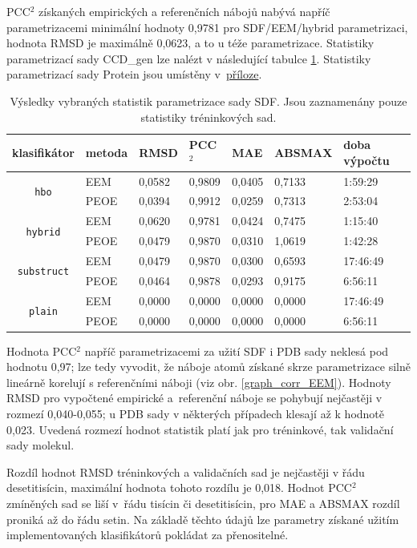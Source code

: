 PCC$^2$ získaných empirických a referenčních nábojů nabývá napříč parametrizacemi minimální hodnoty 0,9781 pro SDF/EEM/hybrid parametrizaci, hodnota RMSD je maximálně 0,0623, a to u téže parametrizace. Statistiky parametrizací sady CCD\_gen lze nalézt v následující tabulce \ref{statistics}. Statistiky parametrizací sady Protein jsou umístěny v~\hyperref[proteinstat]{příloze}. 
\medskip
\begin{table}[h]
    \renewcommand{\arraystretch}{1.4}
    \centering
    \begin{tabular}{c|l|l|l|l|l|l}
         \textbf{klasifikátor} &  \textbf{metoda} & \textbf{RMSD} & \textbf{PCC$^2$} & \textbf{MAE} & \textbf{ABSMAX} & \textbf{doba výpočtu}\\
         \hline
         \multirow{2}{6em}{\texttt{hbo}} & EEM & 0,0582 & 0,9809 & 0,0405 & 0,7133 & 1:59:29  \\
         & PEOE & 0,0394 & 0,9912 & 0,0259 & 0,7313 & 2:53:04 \\
         \hline
         \multirow{2}{6em}{\texttt{hybrid}} & EEM & 0,0620 & 0,9781 & 0,0424 & 0,7475 & 1:15:40 \\
         & PEOE & 0,0479 & 0,9870 & 0,0310 & 1,0619 & 1:42:28 \\
         \hline
         \multirow{2}{6em}{\texttt{substruct}} & EEM & 0,0479 & 0,9870 & 0,0300 & 0,6593 & 17:46:49 \\
         & PEOE & 0,0464 & 0,9878 & 0,0293 & 0,9175 & 6:56:11 \\
         \hline
         \multirow{2}{6em}{\texttt{plain}} & EEM & 0,0000 & 0,0000 & 0,0000 & 0,0000 & 17:46:49 \\
         & PEOE & 0,0000 & 0,0000 & 0,0000 & 0,0000 & 6:56:11
    \end{tabular}
    \caption{Výsledky vybraných statistik parametrizace sady SDF. Jsou zaznamenány pouze statistiky tréninkových sad.}
    \label{statistics}
\end{table}
\medskip

Hodnota PCC$^2$ napříč parametrizacemi za užití SDF i PDB sady neklesá pod hodnotu 0,97; lze tedy vyvodit, že náboje atomů získané skrze parametrizace silně lineárně korelují s referenčními náboji (viz obr. \ref{graph_corr_EEM}). Hodnoty RMSD pro vypočtené empirické a~referenční náboje se pohybují nejčastěji v rozmezí 0,040-0,055; u PDB sady v některých případech klesají až k hodnotě 0,023. Uvedená rozmezí hodnot statistik platí jak pro tréninkové, tak validační sady molekul. 

Rozdíl hodnot RMSD tréninkových a validačních sad je nejčastěji v řádu desetitisícin, maximální hodnota tohoto rozdílu je 0,018. Hodnot PCC$^2$ zmíněných sad se liší v~řádu tisícin či desetitisícin, pro MAE a ABSMAX rozdíl proniká až do řádu setin. Na základě těchto údajů lze  parametry získané užitím implementovaných klasifikátorů pokládat za přenositelné.

